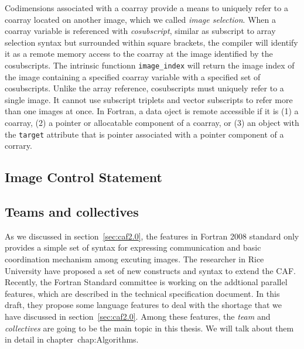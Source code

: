 Codimensions associated with a coarray provide a means to uniquely refer to a coarray located on another image, which we called \emph{image selection}. When a coarray variable is referenced with \emph{cosubscript}, similar as subscript to array selection syntax but surrounded within square brackets, the compiler will identify it as a remote memory access to the coarray at the image identified by the cosubscripts. The intrinsic functionn \texttt{image\_index} will return the image index of the image containing a specified coarray variable with a specified set of cosubscripts. Unlike the array reference, cosubscripts must uniquely refer to a single image. It cannot use subscript triplets and vector subscripts to refer more than one images at once. In Fortran, a data oject is remote accessible if it is (1) a coarray, (2) a pointer or allocatable component of a coarray, or (3) an object with the \texttt{target} attribute that is pointer associated with a pointer component of a corrary. 

\subsection{Image Control Statement}
\subsection{Teams and collectives}
As we discussed in section~\ref{sec:caf2.0}, the features in Fortran 2008 standard only provides a simple set of syntax for expressing communication and basic coordination mechanism among excuting images. The researcher in Rice University have proposed a set of new constructs and syntax to extend the CAF. Recently, the Fortran Standard committee is working on the addtional parallel features, which are described in the technical specification document\cite{caf-spec}. In this draft, they propose some language features to deal with the shortage that we have discussed in section~\ref{sec:caf2.0}. Among these features, the \emph{team} and \emph{collectives} are going to be the main topic in this thesis. We will talk about them in detail in chapter~{chap:Algorithms}.


